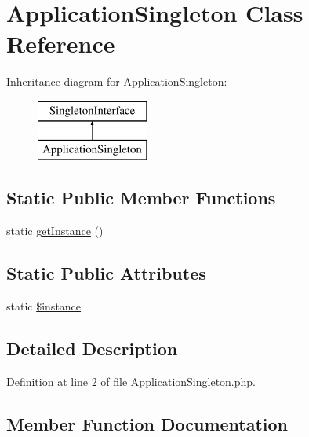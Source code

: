 \hypertarget{class_application_singleton}{}\section{Application\+Singleton Class Reference}
\label{class_application_singleton}
Inheritance diagram for Application\+Singleton\+:\begin{figure}[H]
\begin{center}
\leavevmode
\includegraphics[height=2.000000cm]{class_application_singleton}
\end{center}
\end{figure}
\subsection*{Static Public Member Functions}
\begin{DoxyCompactItemize}
\item 
static \hyperlink{class_application_singleton_ac93fbec81f07e5d15f80db907e63dc10}{get\+Instance} ()
\end{DoxyCompactItemize}
\subsection*{Static Public Attributes}
\begin{DoxyCompactItemize}
\item 
static \hyperlink{class_application_singleton_a9cfc19b3b4f25b2a9007673c57d2f58c}{\$instance}
\end{DoxyCompactItemize}


\subsection{Detailed Description}


Definition at line 2 of file Application\+Singleton.\+php.



\subsection{Member Function Documentation}
\hypertarget{class_application_singleton_ac93fbec81f07e5d15f80db907e63dc10}{}\label{class_application_singleton_ac93fbec81f07e5d15f80db907e63dc10} 
